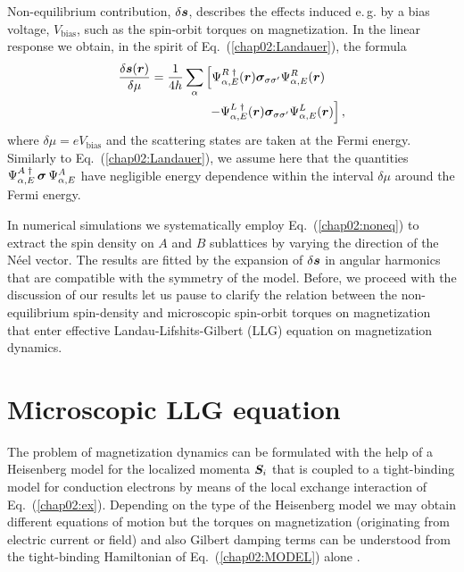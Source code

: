 Non-equilibrium contribution, $\delta\boldsymbol{s}$, describes the effects induced e.\,g. by a bias voltage, $V_\textrm{bias}$, such as the spin-orbit torques on magnetization. In the linear response we obtain, in the spirit of Eq.~(\ref{chap02:Landauer}), the formula
\begin{align}
\frac{\delta\boldsymbol{s}(\boldsymbol{r})}{\delta\mu} =  \frac{1}{4h} \sum_{\alpha}  &\left[\Psi^{R\;\dagger}_{\alpha,E}(\boldsymbol{r}) \boldsymbol{\sigma}_{\sigma\sigma'} \Psi^{R}_{\alpha,E}(\boldsymbol{r}) \right. \nonumber\\
&\; \left. - \Psi^{L\;\dagger}_{\alpha,E}(\boldsymbol{r}) \boldsymbol{\sigma}_{\sigma\sigma'} \Psi^{L}_{\alpha,E}(\boldsymbol{r}) \right],
\label{chap02:noneq}
\end{align}
where $\delta\mu=eV_\textrm{bias}$ and the scattering states are taken at the Fermi energy.  Similarly to Eq.~(\ref{chap02:Landauer}), we assume here that the quantities $\Psi^{A\;\dagger}_{\alpha,E} \,\boldsymbol{\sigma}\, \Psi^{A}_{\alpha,E}$  have negligible energy dependence within the interval $\delta\mu$ around the Fermi energy. 

In numerical simulations we systematically employ Eq.~(\ref{chap02:noneq}) to extract the spin density on $A$ and $B$ sublattices by varying the direction of the N\'eel vector. The results are fitted by the expansion of $\delta\boldsymbol{s}$ in angular harmonics that are compatible with the symmetry of the model. Before, we proceed with the discussion of our results let us pause to clarify the relation between the non-equilibrium spin-density and microscopic spin-orbit torques on magnetization that enter effective Landau-Lifshits-Gilbert (LLG) equation on magnetization dynamics.

\section{Microscopic LLG equation} 

The problem of magnetization dynamics can be formulated with the help of a Heisenberg model for the localized momenta $\boldsymbol{S}_i$ that is coupled to a tight-binding model for conduction electrons by means of the local exchange interaction of Eq.~(\ref{chap02:ex}). Depending on the type of the Heisenberg model we may obtain different equations of motion but the torques on magnetization (originating from electric current or field) and also Gilbert damping terms can be understood from the tight-binding Hamiltonian of Eq.~(\ref{chap02:MODEL}) alone \cite{ado_anisotropy_2019}. 

